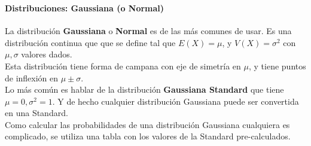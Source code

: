 \documentclass[../main.tex]{subfiles}
\begin{document}
\begin{frame}
  \frametitle{\SECTIONA}
  \framesubtitle{Distribuciones: Gaussiana (o Normal)}

  La distribución \textbf{Gaussiana} o \textbf{Normal} es de las más comunes de usar. Es una distribución continua que que se define tal que \(E(X) = \mu\), y \(V(X) = \sigma^{2}\) con \(\mu, \sigma\) valores dados. \pause \\
  Esta distribución tiene forma de campana con eje de simetría en \(\mu\), y tiene puntos de inflexión en \(\mu \pm \sigma\). \pause \\
  Lo más común es hablar de la distribución \textbf{Gaussiana Standard} que tiene \(\mu = 0, \sigma^{2} = 1\). \pause Y de hecho cualquier distribución Gaussiana puede ser convertida en una Standard. \pause \\
  Como calcular las probabilidades de una distribución Gaussiana cualquiera es complicado, se utiliza una tabla con los valores de la Standard pre-calculados.
\end{frame}
\end{document}
